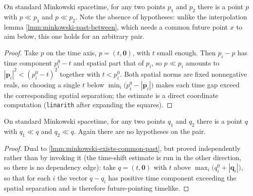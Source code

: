 \medskip

\begin{lemma}
    \label{lmm:minkowski-exists-common-past}
    \leanok
    On standard Minkowski spacetime, for any two points $p_1$ and $p_2$ there is a point $p$ with $p \ll p_1$ and $p \ll p_2$. Note the absence of hypotheses: unlike the interpolation lemma \ref{lmm:minkowski-past-between}, which needs a common future point $x$ to aim below, this one holds for an arbitrary pair.
\end{lemma}
\begin{proof}
    \leanok
    Take $p$ on the time axis, $p = (t, \mathbf{0})$, with $t$ small enough. Then $p_i - p$ has time component $p_i^0 - t$ and spatial part that of $p_i$, so $p \ll p_i$ amounts to $|\mathbf{p}_i|^2 < (p_i^0 - t)^2$ together with $t < p_i^0$. Both spatial norms are fixed nonnegative reals, so choosing a single $t$ below $\min_i\bigl(p_i^0 - |\mathbf{p}_i|\bigr)$ makes each time gap exceed the corresponding spatial separation; the estimate is a direct coordinate computation (\texttt{linarith} after expanding the squares).
\end{proof}

\medskip

\begin{lemma}
    \label{lmm:minkowski-exists-common-future}
    \leanok
    On standard Minkowski spacetime, for any two points $q_1$ and $q_2$ there is a point $q$ with $q_1 \ll q$ and $q_2 \ll q$. Again there are no hypotheses on the pair.
\end{lemma}
\begin{proof}
    \leanok
    Dual to \ref{lmm:minkowski-exists-common-past}, but proved independently rather than by invoking it (the time-shift estimate is run in the other direction, so there is no dependency edge): take $q = (t, \mathbf{0})$ with $t$ above $\max_i\bigl(q_i^0 + |\mathbf{q}_i|\bigr)$, so that for each $i$ the vector $q - q_i$ has positive time component exceeding the spatial separation and is therefore future-pointing timelike.
\end{proof}

